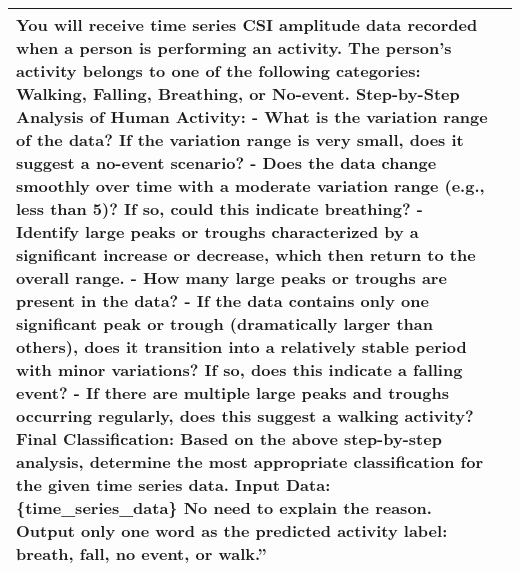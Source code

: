 \begin{table}[ht]
\begin{tabular}{p{3cm} p{10cm}}
        You will receive time series CSI amplitude data recorded when a person is performing an activity. The person's activity belongs to one of the following categories: Walking, Falling, Breathing, or No-event.\newline
        \textbf{Step-by-Step Analysis of Human Activity:}\newline
        - What is the variation range of the data? If the variation range is very small, does it suggest a no-event scenario?\newline
        - Does the data change smoothly over time with a moderate variation range (e.g., less than 5)? If so, could this indicate breathing?\newline
        - Identify large peaks or troughs characterized by a significant increase or decrease, which then return to the overall range.\newline
        - How many large peaks or troughs are present in the data?\newline
        - If the data contains only one significant peak or trough (dramatically larger than others), does it transition into a relatively stable period with minor variations? If so, does this indicate a falling event?\newline
        - If there are multiple large peaks and troughs occurring regularly, does this suggest a walking activity?\newline
        \textbf{Final Classification:} Based on the above step-by-step analysis, determine the most appropriate classification for the given time series data.\newline
        \textbf{Input Data:} \{time\_series\_data\}\newline
        No need to explain the reason. Output only one word as the predicted activity label: breath, fall, no event, or walk.'' \\
        \bottomrule
    \end{tabular}
    \label{tab:prompts}
\end{table}

